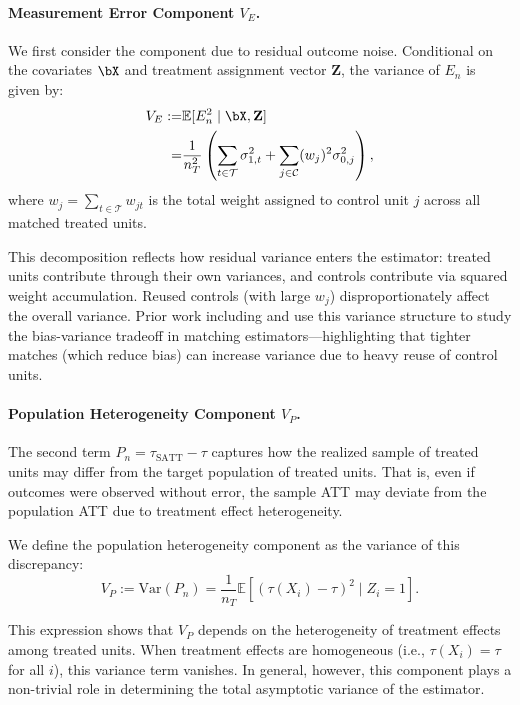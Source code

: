 \documentclass{mytemplate}
\begin{document}
\paragraph{Measurement Error Component \( V_E \).}
We first consider the component due to residual outcome noise. Conditional on the covariates $\bX$ and treatment assignment vector $\mathbf{Z}$, the variance of $E_n$ is given by:
\begin{equation}
\label{eq:CMSE}
\begin{split}
    V_E 
    :=& \mathbb{E}[E_n^2 \mid \bX, \mathbf{Z}] \\ 
    =& \frac{1}{n_T^2} \left(\sum_{t \in \mathcal{T}} \sigma_{1,t}^2 + \sum_{j \in \mathcal{C}} (w_j)^2 \sigma_{0,j}^2 \right),
\end{split}
\end{equation}
where $w_j = \sum_{t \in \mathcal{T}} w_{jt}$ is the total weight assigned to control unit $j$ across all matched treated units.

This decomposition reflects how residual variance enters the estimator: treated units contribute through their own variances, and controls contribute via squared weight accumulation. Reused controls (with large \( w_j \)) disproportionately affect the overall variance. Prior work including \cite{kallus2020generalized} and \cite{che2024caliper} use this variance structure to study the bias-variance tradeoff in matching estimators—highlighting that tighter matches (which reduce bias) can increase variance due to heavy reuse of control units.


\paragraph{Population Heterogeneity Component \( V_P \).}
The second term \( P_n = \tau_{\text{SATT}} - \tau \) captures how the realized sample of treated units may differ from the target population of treated units. That is, even if outcomes were observed without error, the sample ATT may deviate from the population ATT due to treatment effect heterogeneity.

We define the population heterogeneity component as the variance of this discrepancy:
\[
V_P := \text{Var}(P_n) = \frac{1}{n_T} \mathbb{E}\left[\left(\tau(X_i) - \tau\right)^2 \mid Z_i = 1\right].
\]

This expression shows that \( V_P \) depends on the heterogeneity of treatment effects among treated units. When treatment effects are homogeneous (i.e., \( \tau(X_i) = \tau \) for all \( i \)), this variance term vanishes. In general, however, this component plays a non-trivial role in determining the total asymptotic variance of the estimator.
\end{document}
